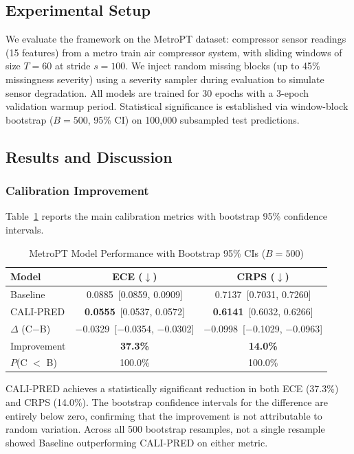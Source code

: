 \documentclass[journal]{IEEEtran}
\begin{document}
\subsection{Experimental Setup}
We evaluate the framework on the MetroPT dataset: compressor sensor readings (15 features) from a metro train air compressor system, with sliding windows of size $T=60$ at stride $s=100$. We inject random missing blocks (up to 45\% missingness severity) using a severity sampler during evaluation to simulate sensor degradation. All models are trained for 30 epochs with a 3-epoch validation warmup period. Statistical significance is established via window-block bootstrap ($B=500$, 95\% CI) on 100{,}000 subsampled test predictions.

\subsection{Results and Discussion}

\subsubsection{Calibration Improvement}
Table~\ref{tab:main_results} reports the main calibration metrics with bootstrap 95\% confidence intervals.

\begin{table}[htbp]
\centering
\caption{MetroPT Model Performance with Bootstrap 95\% CIs ($B=500$)}
\label{tab:main_results}
\begin{tabular}{lcc}
\toprule
Model & ECE ($\downarrow$) & CRPS ($\downarrow$) \\
\midrule
Baseline & 0.0885~[0.0859, 0.0909] & 0.7137~[0.7031, 0.7260] \\
CALI-PRED & \textbf{0.0555}~[0.0537, 0.0572] & \textbf{0.6141}~[0.6032, 0.6266] \\
\midrule
$\Delta$ (C$-$B) & $-$0.0329~[$-$0.0354, $-$0.0302] & $-$0.0998~[$-$0.1029, $-$0.0963] \\
Improvement & \textbf{37.3\%} & \textbf{14.0\%} \\
$P$(C $<$ B) & 100.0\% & 100.0\% \\
\bottomrule
\end{tabular}
\end{table}

CALI-PRED achieves a statistically significant reduction in both ECE (37.3\%) and CRPS (14.0\%). The bootstrap confidence intervals for the difference are entirely below zero, confirming that the improvement is not attributable to random variation. Across all 500 bootstrap resamples, not a single resample showed Baseline outperforming CALI-PRED on either metric.
\end{document}
